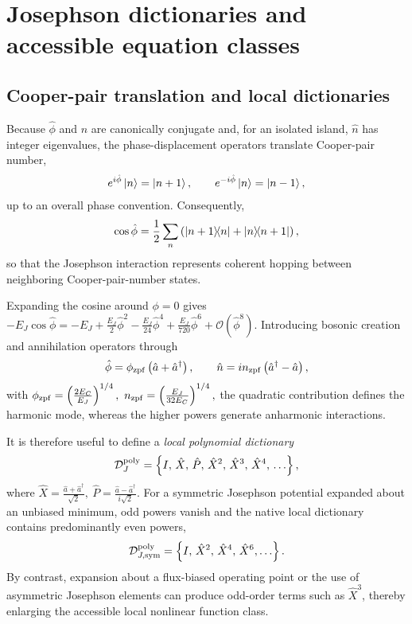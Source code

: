 \documentclass[pra,twocolumn,superscriptaddress,nofootinbib,floatfix]{revtex4-2}
\theoremstyle{remark}
\newcommand{\revcolor}{\color{blue}}
\DeclareRobustCommand{\rev}[1]{{\revcolor #1}}
\begin{document}


\clearpage
\appendix

\section{\rev{Josephson dictionaries and accessible equation classes}}
\label{app:equation-classes}

\subsection{\rev{Cooper-pair translation and local dictionaries}}

\rev{Because \(\hat\phi\) and \(\hat n\) are canonically conjugate and, for an isolated island, \(\hat n\) has integer eigenvalues, the phase-displacement operators translate Cooper-pair number,}
\begin{align}
e^{i\hat\phi}\ket{n}=\ket{n+1},\qquad e^{-i\hat\phi}\ket{n}=\ket{n-1},
\end{align}
up to an overall phase convention. Consequently,
\begin{align}
\cos\hat\phi=\frac{1}{2}\sum_{n}\left(\ketbra{n+1}{n}+\ketbra{n}{n+1}\right),
\end{align}
so that the Josephson interaction represents coherent hopping between neighboring Cooper-pair-number states.

Expanding the cosine around \(\phi=0\) gives \(-E_J\cos\hat\phi=-E_J+\frac{E_J}{2}\hat\phi^2-\frac{E_J}{24}\hat\phi^4+\frac{E_J}{720}\hat\phi^6+\mathcal O(\hat\phi^8).\) Introducing bosonic creation and annihilation operators through
\begin{align}
\hat\phi=\phi_{\rm zpf}\left(\hat a+\hat a^\dagger\right),\qquad \hat n=i n_{\rm zpf}\left(\hat a^\dagger-\hat a\right),
\end{align}
with $\phi_{\rm zpf}=\left(\frac{2E_C}{E_J}\right)^{1/4},\ n_{\rm zpf}=\left(\frac{E_J}{32E_C}\right)^{1/4},$ the quadratic contribution defines the harmonic mode, whereas the higher powers generate anharmonic interactions.

It is therefore useful to define a \emph{local polynomial dictionary}
\begin{align}
\mathcal D_{J}^{\rm poly}=\left\{I,\,\hat X,\,\hat P,\,\hat X^2,\,\hat X^3,\,\hat X^4,\,\ldots\right\},
\label{eq:polynomial-dictionary}
\end{align}
where \(\hat X=\frac{\hat a+\hat a^\dagger}{\sqrt{2}},\ \hat P=\frac{\hat a-\hat a^\dagger}{i\sqrt{2}}.\) For a symmetric Josephson potential expanded about an unbiased minimum, odd powers vanish and the native local dictionary contains predominantly even powers,
\begin{align}
\mathcal D_{J,{\rm sym}}^{\rm poly}=\left\{I,\,\hat X^2,\,\hat X^4,\,\hat X^6,\ldots\right\}.
\end{align}
By contrast, expansion about a flux-biased operating point or the use of asymmetric Josephson elements can produce odd-order terms such as \(\hat X^3\), thereby enlarging the accessible local nonlinear function class.
\end{document}
